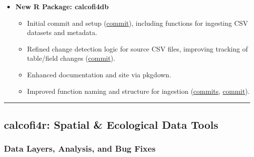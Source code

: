 \documentclass[
  letterpaper,
  DIV=11,
  numbers=noendperiod]{scrreprt}
\providecommand{\tightlist}{%
  \setlength{\itemsep}{0pt}\setlength{\parskip}{0pt}}
\begin{document}
\begin{itemize}
\tightlist
\item
  \textbf{New R Package: calcofi4db}

  \begin{itemize}
  \tightlist
  \item
    Initial commit and setup
    (\href{https://github.com/CalCOFI/calcofi4db/commit/f00e99a089b26b0def9a6362a942d25fcd75e37f}{commit}),
    including functions for ingesting CSV datasets and metadata.
  \item
    Refined change detection logic for source CSV files, improving
    tracking of table/field changes
    (\href{https://github.com/CalCOFI/calcofi4db/commit/2a29b9e66e9ec83440cc397d9de70b9c7917ba61}{commit}).
  \item
    Enhanced documentation and site via pkgdown.
  \item
    Improved function naming and structure for ingestion
    (\href{https://github.com/CalCOFI/calcofi4db/commit/b6cf4f6896d0707dc01fc6bcada4ae1b597060a8}{commits},
    \href{https://github.com/CalCOFI/calcofi4db/commit/7748dea5b20aa34615da27f2869d21f4262ca344}{commit}).
  \end{itemize}
\end{itemize}

\begin{center}\rule{0.5\linewidth}{0.5pt}\end{center}

\subsection{calcofi4r: Spatial \& Ecological Data
Tools}\label{calcofi4r-spatial-ecological-data-tools}

\subsubsection{Data Layers, Analysis, and Bug
Fixes}\label{data-layers-analysis-and-bug-fixes}
\end{document}
